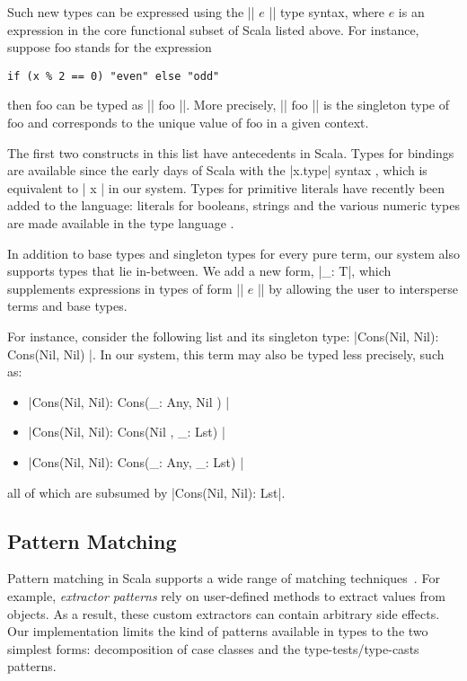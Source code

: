 Such new types can be expressed using the |{| $e$ |}| type syntax, where $e$ is an expression in the core functional subset of Scala listed above.
For instance, suppose $\text{foo}$ stands for the expression

\begin{lstlisting}
if (x % 2 == 0) "even" else "odd"
\end{lstlisting}

\noindent then $\text{foo}$ can be typed as |{| $\text{foo}$ |}|. More precisely, |{| $\text{foo}$ |}| is the singleton type of $\text{foo}$ and corresponds to the unique value of $\text{foo}$ in a given context.

The first two constructs in this list have antecedents in Scala. Types for bindings are available since the early days of Scala with the |x.type| syntax \citep[Section 3.2.1]{scalaSpec}, which is equivalent to |{ x }| in our system.
Types for primitive literals have recently been added to the language: literals for booleans, strings and the various numeric types are made available in the type language \citep{sip23}.

In addition to base types and singleton types for every pure term, our system also supports types that lie in-between. We add a new form, |_: T|, which supplements expressions in types of form |{| $e$ |}| by allowing the user to intersperse terms and base types.

For instance, consider the following list and its singleton type: |Cons(Nil, Nil): { Cons(Nil, Nil) }|.
In our system, this term may also be typed less precisely, such as:

\begin{itemize}
  \item |Cons(Nil, Nil): { Cons(_: Any, Nil   ) }|
  \item |Cons(Nil, Nil): { Cons(Nil   , _: Lst) }|
  \item |Cons(Nil, Nil): { Cons(_: Any, _: Lst) }|
\end{itemize}

all of which are subsumed by |Cons(Nil, Nil): Lst|.


\subsection{Pattern Matching}
\label{pattern-matching}

Pattern matching in Scala supports a wide range of matching techniques~\citep{emir2007matching}.
For example, \emph{extractor patterns} rely on user-defined methods to extract values from objects.
As a result, these custom extractors can contain arbitrary side effects.
Our implementation limits the kind of patterns available in types to the two simplest forms: decomposition of case classes and the type-tests/type-casts patterns.

